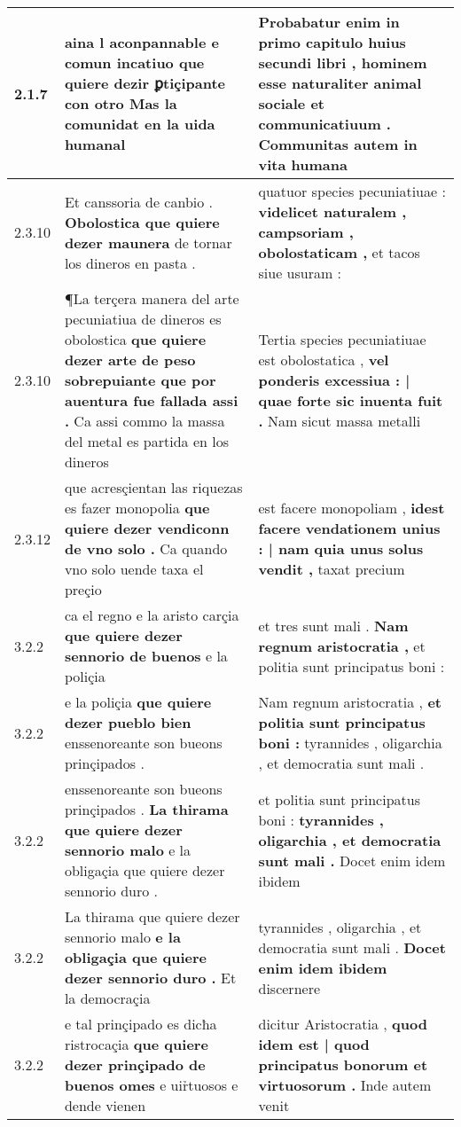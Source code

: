 \begin{tabular}{|p{1cm}|p{6.5cm}|p{6.5cm}|}
2.1.7 & aina l aconpannable e comun incatiuo \textbf{ que quiere dezir ꝑtiçipante con otro } Mas la comunidat en la uida humanal & Probabatur enim in primo capitulo huius secundi libri , \textbf{ hominem esse naturaliter animal sociale et communicatiuum . } Communitas autem in vita humana \\\hline
2.3.10 & Et canssoria de canbio . \textbf{ Obolostica que quiere dezer maunera } de tornar los dineros en pasta . & quatuor species pecuniatiuae : \textbf{ videlicet naturalem , campsoriam , obolostaticam , } et tacos siue usuram : \\\hline
2.3.10 & ¶La terçera manera del arte pecuniatiua de dineros es obolostica \textbf{ que quiere dezer arte de peso sobrepuiante que por auentura fue fallada assi . } Ca assi commo la massa del metal es partida en los dineros & Tertia species pecuniatiuae est obolostatica , \textbf{ vel ponderis excessiua : | quae forte sic inuenta fuit . } Nam sicut massa metalli \\\hline
2.3.12 & que acresçientan las riquezas es fazer monopolia \textbf{ que quiere dezer vendiconn de vno solo . } Ca quando vno solo uende taxa el preçio & est facere monopoliam , \textbf{ idest facere vendationem unius : | nam quia unus solus vendit , } taxat precium \\\hline
3.2.2 & ca el regno e la aristo carçia \textbf{ que quiere dezer sennorio de buenos } e la poliçia & et tres sunt mali . \textbf{ Nam regnum aristocratia , } et politia sunt principatus boni : \\\hline
3.2.2 & e la poliçia \textbf{ que quiere dezer pueblo bien } enssenoreante son bueons prinçipados . & Nam regnum aristocratia , \textbf{ et politia sunt principatus boni : } tyrannides , oligarchia , et democratia sunt mali . \\\hline
3.2.2 & enssenoreante son bueons prinçipados . \textbf{ La thirama que quiere dezer sennorio malo } e la obligaçia que quiere dezer sennorio duro . & et politia sunt principatus boni : \textbf{ tyrannides , oligarchia , et democratia sunt mali . } Docet enim idem ibidem \\\hline
3.2.2 & La thirama que quiere dezer sennorio malo \textbf{ e la obligaçia que quiere dezer sennorio duro . } Et la democraçia & tyrannides , oligarchia , et democratia sunt mali . \textbf{ Docet enim idem ibidem } discernere \\\hline
3.2.2 & e tal prinçipado es dicħa ristrocaçia \textbf{ que quiere dezer prinçipado de buenos omes } e uir̉tuosos e dende vienen & dicitur Aristocratia , \textbf{ quod idem est | quod principatus bonorum et virtuosorum . } Inde autem venit \\\hline

\end{tabular}
